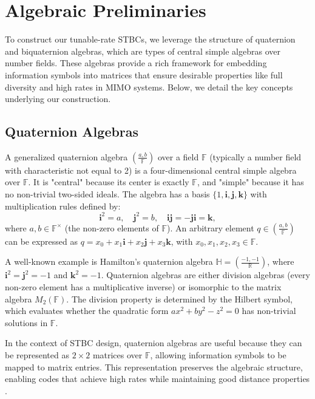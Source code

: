 \section{Algebraic Preliminaries}
To construct our tunable-rate STBCs, we leverage the structure of quaternion and biquaternion algebras, which are types of central simple algebras over number fields. 
These algebras provide a rich framework for embedding information symbols into matrices that ensure desirable properties like full diversity and high rates in MIMO systems. 
Below, we detail the key concepts underlying our construction.

\subsection{Quaternion Algebras}

A generalized quaternion algebra $\left(\frac{a, b}{\mathbb{F}}\right)$ over a field $\mathbb{F}$ (typically a number field with characteristic not equal to 2) is a four-dimensional central simple algebra over $\mathbb{F}$. It is "central" because its center is exactly $\mathbb{F}$, and "simple" because it has no non-trivial two-sided ideals. The algebra has a basis $\{1, \mathbf{i}, \mathbf{j}, \mathbf{k}\}$ with multiplication rules defined by:
\begin{equation}
\mathbf{i}^2 = a, \quad \mathbf{j}^2 = b, \quad \mathbf{ij} = -\mathbf{ji} = \mathbf{k},
\end{equation}
where $a, b \in \mathbb{F}^\times$ (the non-zero elements of $\mathbb{F}$). An arbitrary element $q \in \left(\frac{a, b}{\mathbb{F}}\right)$ can be expressed as $q = x_0 + x_1 \mathbf{i} + x_2 \mathbf{j} + x_3 \mathbf{k}$, with $x_0, x_1, x_2, x_3 \in \mathbb{F}$.

A well-known example is Hamilton's quaternion algebra $\mathbb{H} = \left(\frac{-1, -1}{\mathbb{R}}\right)$, where $\mathbf{i}^2 = \mathbf{j}^2 = -1$ and $\mathbf{k}^2 = -1$. Quaternion algebras are either division algebras (every non-zero element has a multiplicative inverse) or isomorphic to the matrix algebra $M_2(\mathbb{F})$. The division property is determined by the Hilbert symbol, which evaluates whether the quadratic form $a x^2 + b y^2 - z^2 = 0$ has non-trivial solutions in $\mathbb{F}$.

In the context of STBC design, quaternion algebras are useful because they can be represented as $2 \times 2$ matrices over $\mathbb{F}$, allowing information symbols to be mapped to matrix entries. This representation preserves the algebraic structure, enabling codes that achieve high rates while maintaining good distance properties \cite{3}.

